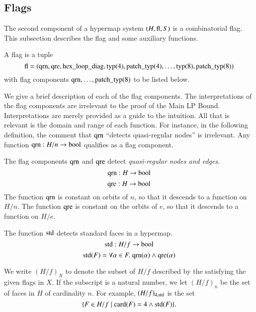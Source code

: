 \subsection{Flags}
\label{sec:flag}

The second component of a  hypermap system $(H,{\operatorname{fl}},S)$ is a
combinatorial flag.  This subsection describes the flag and some
auxiliary functions.

\begin{definition}
 A flag is a tuple
    $$
    {\operatorname{fl}}=({\operatorname{qrn}},{\operatorname{qre}},{\operatorname{hex\_loop\_diag}},
    {\operatorname{typ}}(4),{\operatorname{patch\_typ}}(4),\ldots,
    {\operatorname{typ}}(8),{\operatorname{patch\_typ}}(8))
    $$
 with flag components ${\operatorname{qrn}},\ldots,{\operatorname{patch\_typ}}(8)$ to be listed below.
 \end{definition}

We give a brief description of each of the flag components.  The
interpretations of the flag components are irrelevant to the proof
of the Main LP Bound.  Interpretations are merely provided as a
guide to the intuition.  All that is relevant is the domain and
range of each function.  For instance, in the following
definition, the comment that ${\operatorname{qrn}}$ ``detects quasi-regular
nodes'' is irrelevant.  Any function ${\operatorname{qrn}}:H/n\to\operatorname{bool}$
qualifies as a flag component.

 \begin{definition}
 The flag components ${\operatorname{qrn}}$ and ${\operatorname{qre}}$ detect {\it quasi-regular
 nodes and edges}.
        $${\operatorname{qrn}}:H \to \operatorname{bool}$$
        $${\operatorname{qre}}:H \to \operatorname{bool}$$
 The function ${\operatorname{qrn}}$ is constant on orbits of $n$, so that it
 descends to a function on $H/n$.  The function ${\operatorname{qre}}$ is
 constant on the orbits of $e$, so that it descends to a function
 on $H/e$.
\end{definition}

\begin{definition} The function ${\operatorname{std}}$ detects standard faces
in a hypermap.
    $${\operatorname{std}}:H/f \to \operatorname{bool}$$
$${\operatorname{std}}(F) = \forall\alpha\in F.\
{\operatorname{qrn}}(\alpha)\wedge {\operatorname{qre}}(\alpha)
$$
\end{definition}

\begin{notation}
We write $(H/f)_X$ to denote the subset of $H/f$ described by the
satisfying the given flags in $X$.  If the subscript is a natural
number, we let $(H/f)_n$ be the set of faces in $H$ of cardinality
$n$.  For example, $(H/f)_{4,{\operatorname{std}}}$ is the set
    $$
    \{F \in H/f \mid {\operatorname{card}}(F) = 4 \wedge {\operatorname{std}}(F)\}.
    $$
\end{notation}

